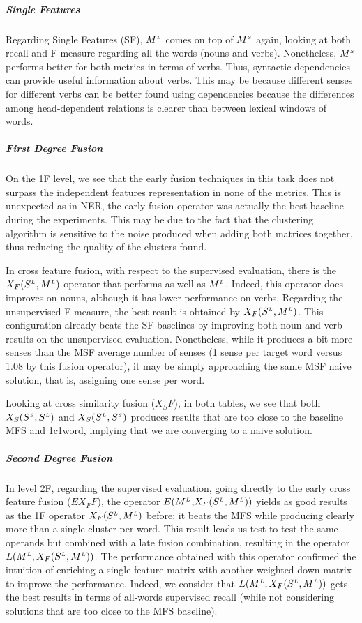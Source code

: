 \subparagraph{Single Features}
Regarding Single Features (SF), $M^{\scriptscriptstyle L}$ comes on top of $M^{\scriptscriptstyle S}$ again, looking at both recall and F-measure regarding all the words (nouns and verbs). Nonetheless, $M^{\scriptscriptstyle S}$ performs better for both metrics in terms of verbs. Thus, syntactic dependencies can provide useful information  about verbs. This may be because different senses for different verbs can be better found using dependencies because the differences among head-dependent relations is clearer than between lexical windows of words. 

\subparagraph{First Degree Fusion}
On the 1F level, we see that the early fusion techniques in this task does not surpass the independent features representation in none of the metrics. This is unexpected as in NER, the early fusion operator was actually the best baseline during the experiments. This may be due to the fact that the clustering algorithm is sensitive to the noise produced when adding both matrices together, thus reducing the quality of the clusters found. 

In cross feature fusion, with respect to the supervised evaluation, there is the $X_F(S^{\scriptscriptstyle L},M^{\scriptscriptstyle L})$ operator that performs as well as $M^{\scriptscriptstyle L}$. Indeed, this operator does improves on nouns, although it has lower performance on verbs.
%
Regarding the unsupervised F-measure, the best result is obtained by $X_F(S^{\scriptscriptstyle L}, M^{\scriptscriptstyle L})$. This configuration already beats the SF baselines by improving both noun and verb results on the unsupervised evaluation. Nonetheless,  while it produces a bit more senses than the MSF average number of senses (1 sense per target word versus 1.08 by this fusion operator), it may be simply approaching  the same MSF naive solution, that is, assigning one sense per word. 


Looking at cross similarity fusion ($X_SF$), in both tables, we see that both  $X_S(S^{\scriptscriptstyle S},S^{\scriptscriptstyle L})$ and $X_S(S^{\scriptscriptstyle L},S^{\scriptscriptstyle S})$ produces results that are too close to the baseline MFS and 1c1word, implying that we are converging to a naive solution.


\subparagraph{Second Degree Fusion}
In level 2F, regarding the supervised evaluation, going directly to  the early cross feature fusion ($EX_FF$), the operator $E(M^{\scriptscriptstyle L}$,$X_F(S^{\scriptscriptstyle L}, M^{\scriptscriptstyle L}))$ yields as good results as the 1F operator  $X_F(S^{\scriptscriptstyle L}, M^{\scriptscriptstyle L})$ before: it beats the MFS while producing clearly more than a single cluster per word. This result leads us  test to test the same operands but combined with a late fusion combination, resulting in the operator $L(M^{\scriptscriptstyle L}, X_F(S^{\scriptscriptstyle L},M^{\scriptscriptstyle L}))$. The performance obtained with this operator confirmed the intuition of enriching a single feature matrix with another weighted-down matrix to improve the performance. Indeed, we consider that $L(M^{\scriptscriptstyle L}, X_F(S^{\scriptscriptstyle L}, M^{\scriptscriptstyle L}))$ gets the best results in terms of all-words supervised recall (while not considering solutions that are too close to the MFS baseline). 

